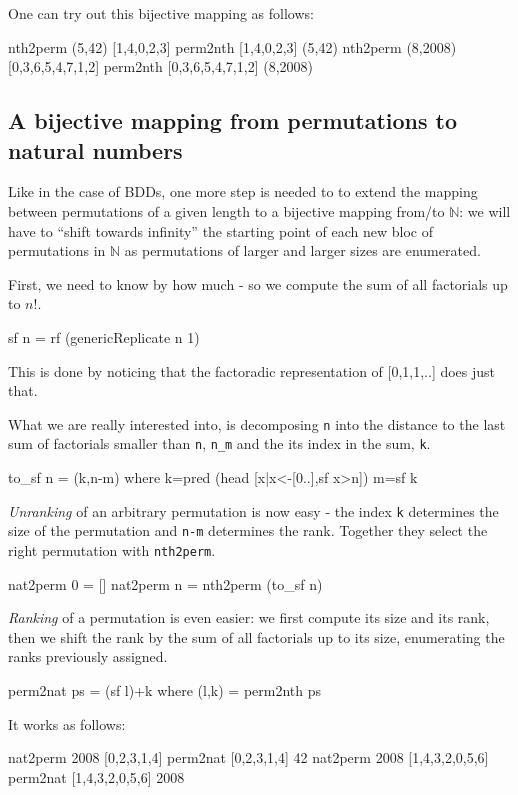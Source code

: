 \documentclass[]{INCLUDES/llncs}
\begin{document}
One can try out this bijective mapping as follows:
\begin{codex}
nth2perm (5,42)
  [1,4,0,2,3]
perm2nth [1,4,0,2,3]
  (5,42)
nth2perm (8,2008)
  [0,3,6,5,4,7,1,2]
perm2nth [0,3,6,5,4,7,1,2]
  (8,2008)
\end{codex}

\subsection{A bijective mapping from permutations to natural numbers}
Like in the case of BDDs, one more step is needed to to extend the mapping
between permutations of a given length to a bijective 
mapping from/to $\mathbb{N}$: we will have to ``shift
towards infinity'' the starting point of each new bloc of permutations in $\mathbb{N}$
as permutations of larger and larger sizes are enumerated.

First, we need to know by how much - so we compute the sum of
all factorials up to $n!$.
\begin{code}
sf n = rf (genericReplicate n 1)
\end{code}
This is done by noticing that the factoradic representation of
[0,1,1,..] does just that.

What we are really interested into, is decomposing {\tt n} into
the distance to the
last sum of factorials smaller than {\tt n}, {\tt n\_m}
and the its index in the sum, {\tt k}.
\begin{code}
to_sf n = (k,n-m) where 
  k=pred (head [x|x<-[0..],sf x>n])
  m=sf k
\end{code}
{\em Unranking} of an arbitrary permutation is now easy - the index {\tt k}
determines the size of the permutation and {\tt n-m} determines
the rank. Together they select the right permutation with {\tt nth2perm}.
\begin{code}
nat2perm 0 = []
nat2perm n = nth2perm (to_sf n)
\end{code}
{\em Ranking} of a permutation is even easier: we first compute
its size and its rank, then we shift the rank by 
the sum of all factorials up to its size, enumerating the
ranks previously assigned.
\begin{code}
perm2nat ps = (sf l)+k where 
  (l,k) = perm2nth ps
\end{code}
It works as follows:
\begin{codex}
nat2perm 2008
  [0,2,3,1,4]
perm2nat [0,2,3,1,4]
  42
nat2perm 2008
  [1,4,3,2,0,5,6]
perm2nat [1,4,3,2,0,5,6]
  2008
\end{codex}
\end{document}
